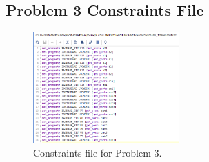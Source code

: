\documentclass[11pt]{article}
\begin{document}
\begin{appendices}
\section{Problem 3 Constraints File}
\begin{figure}[H]
\begin{center}
	\includegraphics[width=0.5\textwidth]{./report-images/Part3/P3Const.png}
	\caption{\label{fig:Part3ConstFile}Constraints file for Problem 3.}
\end{center}
\end{figure}
\end{appendices}
\end{document}
